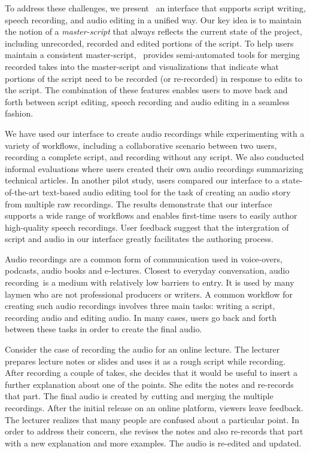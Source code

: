 To address these challenges, we present \systemname\, an interface that supports script writing, speech recording, and audio editing in a unified way. Our key idea is to maintain the notion of a \emph{master-script} that always reflects the current state of the project, including unrecorded, recorded and edited portions of the script. To help users maintain a consistent master-script, \systemname\ provides semi-automated tools for merging recorded takes into the master-script and visualizations that indicate what portions of the script need to be recorded (or re-recorded) in response to edits to the script. The combination of these features enables users to move back and forth between script editing, speech recording and audio editing in a seamless fashion.

We have used our interface to create audio recordings while experimenting with a variety of workflows, including a collaborative scenario between two users, recording a complete script, and recording without any script. We also conducted informal evaluations where users created their own audio recordings summarizing technical articles.   In another pilot study, users compared our interface to a state-of-the-art text-based audio editing tool for the task of creating an audio story from multiple raw recordings. The results demonstrate that our interface supports a wide range of workflows and enables first-time users to  easily author high-quality speech recordings. User feedback suggest that the intergration of script and audio in our interface greatly facilitates the authoring process. 

Audio recordings are a common form of communication used in voice-overs, podcasts, audio books and e-lectures. Closest to everyday conversation, audio recording\ is a medium with relatively low barriers to entry. It is used by many laymen who are not professional producers or writers. A common workflow for creating such audio recordings involves three main tasks: writing a script, recording audio and editing audio. In many cases, users go back and forth between these tasks in order to create the final audio. 

Consider the case of recording the audio for an online lecture. The lecturer prepares lecture notes or slides and uses it as a rough script while recording. After recording a couple of takes, she decides that it would be useful to insert a further explanation about one of the points. She edits the notes and re-records that part. The final audio is created by cutting and merging the multiple recordings. After the initial release on an online platform, viewers leave feedback. The lecturer realizes that many people are confused about a particular point. In order to address their concern, she revises the notes and also  re-records that part with a new explanation and more examples. The audio is re-edited and updated. 

